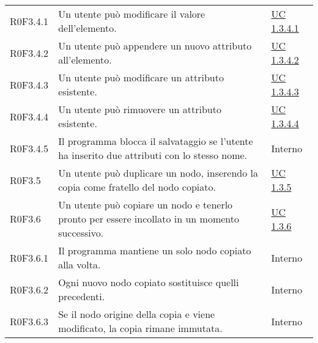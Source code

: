 \begin{center}
\begin{longtable}{p{4.2cm}!{\color{white}\vrule width 0.5mm}p{6cm}!{\color{white}\vrule width 0.5mm}p{2.5cm}!{\color{white}\vrule width 0.5mm}}
				\hspace{4mm}\hypertarget{XER0F3.4.1}{R0F3.4.1} & Un utente può modificare il valore dell'elemento. & \hyperref[subsec:XEUC1.3.4.1]{UC 1.3.4.1}\\
	
				\hspace{4mm}\hypertarget{XER0F3.4.2}{R0F3.4.2} & Un utente può appendere un nuovo attributo all'elemento. & \hyperref[subsec:XEUC1.3.4.2]{UC 1.3.4.2}\\
	
				\hspace{4mm}\hypertarget{XER0F3.4.3}{R0F3.4.3} & Un utente può modificare un attributo esistente. & \hyperref[subsec:XEUC1.3.4.3]{UC 1.3.4.3}\\
	
				\hspace{4mm}\hypertarget{XER0F3.4.4}{R0F3.4.4} & Un utente può rimuovere un attributo esistente. & \hyperref[subsec:XEUC1.3.4.4]{UC 1.3.4.4}\\
	
				\hspace{4mm}\hypertarget{XER0F3.4.5}{R0F3.4.5} & Il programma blocca il salvataggio se l'utente ha inserito due attributi con lo stesso nome. & Interno\\
	
			\hspace{2mm}\hypertarget{XER0F3.5}{R0F3.5} & Un utente può duplicare un nodo, inserendo la copia come fratello del nodo copiato. & \hyperref[subsec:XEUC1.3.5]{UC 1.3.5}\\
	
			\hspace{2mm}\hypertarget{XER0F3.6}{R0F3.6} & Un utente può copiare un nodo e tenerlo pronto per essere incollato in un momento successivo. & \hyperref[subsec:XEUC1.3.6]{UC 1.3.6}\\
				
				\hspace{4mm}\hypertarget{XER0F3.6.1}{R0F3.6.1} & Il programma mantiene un solo nodo copiato alla volta. & Interno\\
	
				\hspace{4mm}\hypertarget{XER0F3.6.2}{R0F3.6.2} & Ogni nuovo nodo copiato sostituisce quelli precedenti. & Interno\\
	
				\hspace{4mm}\hypertarget{XER0F3.6.3}{R0F3.6.3} & Se il nodo origine della copia e viene modificato, la copia rimane immutata. & Interno\\
	

\end{longtable}
\end{center}
